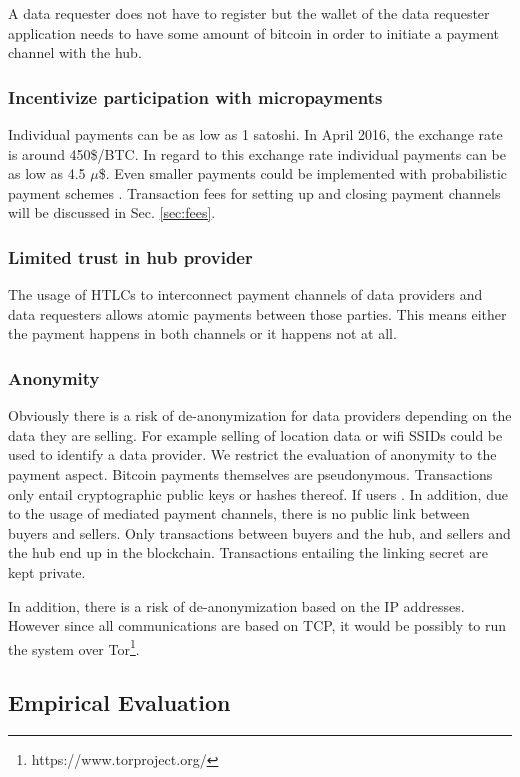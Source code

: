A data requester does not have to register but the wallet of the data requester application needs to have some amount of bitcoin in order to initiate a payment channel with the hub.

\subsubsection{Incentivize participation with micropayments}
Individual payments can be as low as 1 satoshi. In April 2016, the exchange rate is around 450\$/BTC. In regard to this exchange rate individual payments can be as low as 4.5 $\mu$\$. Even smaller payments could be implemented with probabilistic payment schemes \cite{Rivest1997,Pass:2015:MDC:2810103.2813713}. Transaction fees for setting up and closing payment channels will be discussed in Sec. \ref{sec:fees}. 

\subsubsection{Limited trust in hub provider}
The usage of HTLCs to interconnect payment channels of data providers and data requesters allows atomic payments between those parties. This means either the payment happens in both channels or it happens not at all. 

\subsubsection{Anonymity}
Obviously there is a risk of de-anonymization for data providers depending on the data they are selling. For example selling of location data or wifi SSIDs could be used to identify a data provider. We restrict the evaluation of anonymity to the payment aspect. Bitcoin payments themselves are pseudonymous. Transactions only entail cryptographic public keys or hashes thereof. If users . In addition, due to the usage of mediated payment channels, there is no public link between buyers and sellers. Only transactions between buyers and the hub, and sellers and the hub end up in the blockchain. Transactions entailing the linking secret are kept private. 

In addition, there is a risk of de-anonymization based on the IP addresses. However since all communications are based on TCP, it would be possibly to run the system over Tor\footnote{https://www.torproject.org/}.


\subsection{Empirical Evaluation}

